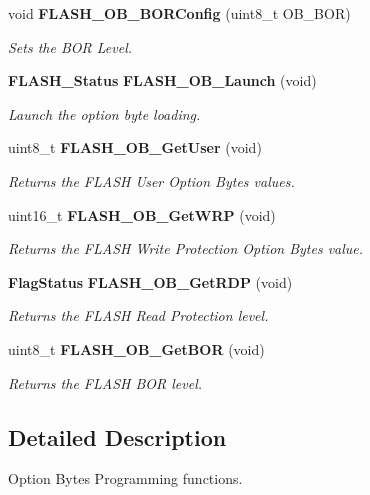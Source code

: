 \begin{DoxyCompactItemize}
void \textbf{ F\+L\+A\+S\+H\+\_\+\+O\+B\+\_\+\+B\+O\+R\+Config} (uint8\+\_\+t O\+B\+\_\+\+B\+OR)
\begin{DoxyCompactList}\small\item\em Sets the B\+OR Level. \end{DoxyCompactList}\item 
\textbf{ F\+L\+A\+S\+H\+\_\+\+Status} \textbf{ F\+L\+A\+S\+H\+\_\+\+O\+B\+\_\+\+Launch} (void)
\begin{DoxyCompactList}\small\item\em Launch the option byte loading. \end{DoxyCompactList}\item 
uint8\+\_\+t \textbf{ F\+L\+A\+S\+H\+\_\+\+O\+B\+\_\+\+Get\+User} (void)
\begin{DoxyCompactList}\small\item\em Returns the F\+L\+A\+SH User Option Bytes values. \end{DoxyCompactList}\item 
uint16\+\_\+t \textbf{ F\+L\+A\+S\+H\+\_\+\+O\+B\+\_\+\+Get\+W\+RP} (void)
\begin{DoxyCompactList}\small\item\em Returns the F\+L\+A\+SH Write Protection Option Bytes value. \end{DoxyCompactList}\item 
\textbf{ Flag\+Status} \textbf{ F\+L\+A\+S\+H\+\_\+\+O\+B\+\_\+\+Get\+R\+DP} (void)
\begin{DoxyCompactList}\small\item\em Returns the F\+L\+A\+SH Read Protection level. \end{DoxyCompactList}\item 
uint8\+\_\+t \textbf{ F\+L\+A\+S\+H\+\_\+\+O\+B\+\_\+\+Get\+B\+OR} (void)
\begin{DoxyCompactList}\small\item\em Returns the F\+L\+A\+SH B\+OR level. \end{DoxyCompactList}\end{DoxyCompactItemize}


\subsection{Detailed Description}
Option Bytes Programming functions. 

